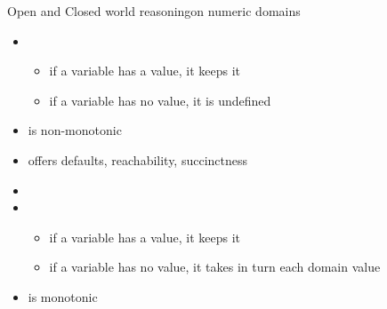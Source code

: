 \begin{frame}{Open and Closed world reasoning}{on numeric domains}
  \bigskip
  \begin{itemize}
  \item<1-> 
    \begin{itemize}
    \item if a variable has a value,  it keeps it
    \item if a variable has no value, it is undefined
    \end{itemize}
  \item<only@3->[] is non-monotonic
  \item<only@4->[] offers defaults, reachability, succinctness
  \item<only@2-3>[]
  \item<2-> 
    \begin{itemize}
    \item if a variable has a value,  it keeps it
    \item if a variable has no value, it takes in turn each domain value
    \end{itemize}
  \item<only@3->[] is monotonic
  \end{itemize}
\end{frame}
%
